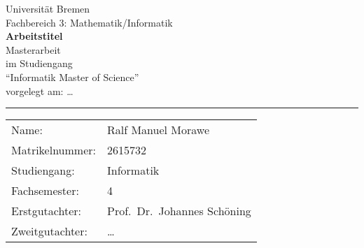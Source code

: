 \begin{titlepage}
\begin{center}
    \LARGE Universität Bremen\\
    \large Fachbereich 3: Mathematik/Informatik\\
    \vspace{2cm}
    \LARGE\textsf{\textbf{Arbeitstitel}} \\
    \vspace{2cm}
    \LARGE Masterarbeit\\
    \vspace{0.5cm}
    \large
    im Studiengang\\
    \enquote{Informatik Master of Science}\\
    \vspace{1cm}
    \normalsize
    vorgelegt am: \dots \\
    \vspace{3.5cm}
\end{center}
\vfill
\noindent
\hrule
\vspace{1em}
\begin{tabular}{ll}
    Name: & {Ralf Manuel Morawe} \\
    Matrikelnummer: & {2615732} \\
    Studiengang: & Informatik\\
    Fachsemester: & 4\\
    Erstgutachter: & {Prof.\ Dr.\ Johannes Schöning} \\
    Zweitgutachter: & {\dots}
\end{tabular}
\end{titlepage}
\cleardoublepage
